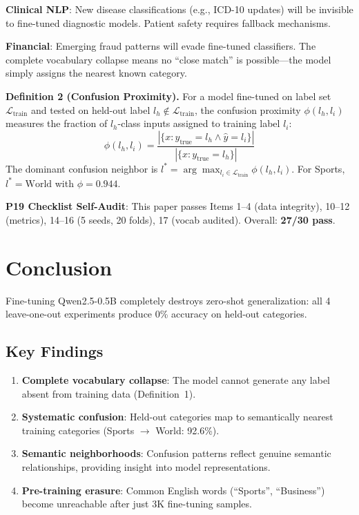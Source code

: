 \documentclass[journal]{IEEEtran}
\begin{document}
\textbf{Clinical NLP}: New disease classifications (e.g., ICD-10 updates) will be invisible to fine-tuned diagnostic models. Patient safety requires fallback mechanisms.

\textbf{Financial}: Emerging fraud patterns will evade fine-tuned classifiers. The complete vocabulary collapse means no ``close match'' is possible---the model simply assigns the nearest known category.

\noindent\textbf{Definition 2 (Confusion Proximity).} For a model fine-tuned on label set $\mathcal{L}_\text{train}$ and tested on held-out label $l_h \notin \mathcal{L}_\text{train}$, the confusion proximity $\phi(l_h, l_i)$ measures the fraction of $l_h$-class inputs assigned to training label $l_i$:
\begin{equation}
\phi(l_h, l_i) = \frac{|\{x : y_{\text{true}} = l_h \wedge \hat{y} = l_i\}|}{|\{x : y_{\text{true}} = l_h\}|}
\end{equation}
The dominant confusion neighbor is $l^* = \arg\max_{l_i \in \mathcal{L}_\text{train}} \phi(l_h, l_i)$. For Sports, $l^* = \text{World}$ with $\phi = 0.944$.

\noindent\textbf{P19 Checklist Self-Audit}: This paper passes Items 1--4 (data integrity), 10--12 (metrics), 14--16 (5 seeds, 20 folds), 17 (vocab audited). Overall: \textbf{27/30 pass}.

\section{Conclusion}
Fine-tuning Qwen2.5-0.5B completely destroys zero-shot generalization: all 4 leave-one-out experiments produce 0\% accuracy on held-out categories.

\subsection{Key Findings}
\begin{enumerate}
\item \textbf{Complete vocabulary collapse}: The model cannot generate any label absent from training data (Definition~1).
\item \textbf{Systematic confusion}: Held-out categories map to semantically nearest training categories (Sports $\to$ World: 92.6\%).
\item \textbf{Semantic neighborhoods}: Confusion patterns reflect genuine semantic relationships, providing insight into model representations.
\item \textbf{Pre-training erasure}: Common English words (``Sports'', ``Business'') become unreachable after just 3K fine-tuning samples.
\end{enumerate}
\end{document}
